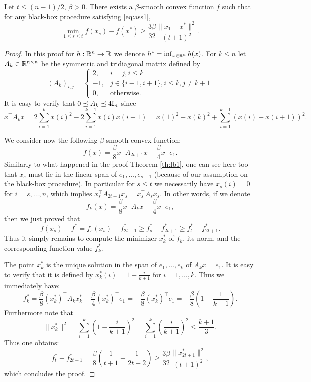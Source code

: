 \begin{theorem} \label{th:lb2}
Let $t \leq (n-1)/2$, $\beta >0$. There exists a $\beta$-smooth convex function $f$ such that for any black-box procedure satisfying \eqref{eq:ass1},
$$\min_{1 \leq s \leq t} f(x_s) - f(x^*) \geq  \frac{3 \beta}{32} \frac{\|x_1 - x^*\|^2}{(t+1)^2} .$$
\end{theorem}

\begin{proof} In this proof for $h: \mathbb{R}^n \rightarrow \mathbb{R}$ we denote $h^* = \inf_{x \in \mathbb{R}^n} h(x)$.
For $k \leq n$ let $A_k \in \mathbb{R}^{n \times n}$ be the symmetric and tridiagonal matrix defined by
$$(A_k)_{i,j}  = \left\{\begin{array}{ll} 
2, & i = j, i \leq k \\
-1, & j \in \{i-1, i+1\}, i \leq k, j \neq k+1\\
0, & \text{otherwise}.
\end{array}\right.$$
It is easy to verify that $0 \preceq A_k \preceq 4 \mathrm{I}_n$ since
$$x^{\top} A_k x = 2 \sum_{i=1}^k x(i)^2 - 2 \sum_{i=1}^{k-1} x(i) x(i+1) = x(1)^2 + x(k)^2 + \sum_{i=1}^{k-1} (x(i) - x(i+1))^2 .$$

We consider now the following $\beta$-smooth convex function:
$$f(x) = \frac{\beta}{8} x^{\top} A_{2 t + 1} x - \frac{\beta}{4} x^{\top} e_1 .$$
Similarly to what happened in the proof Theorem \ref{th:lb1}, one can see here too that $x_s$ must lie in the linear span of $e_1, \hdots, e_{s-1}$ (because of our assumption on the black-box procedure). In particular for $s \leq t$ we necessarily have $x_s(i) = 0$ for $i=s, \hdots, n$, which implies $x_s^{\top} A_{2 t+1} x_s = x_s^{\top} A_{s} x_s$. In other words, if we denote
$$f_k(x) = \frac{\beta}{8} x^{\top} A_{k} x - \frac{\beta}{4} x^{\top} e_1 ,$$
then we just proved that
$$f(x_s) - f^* = f_s(x_s) - f_{2t+1}^* \geq f_{s}^* - f_{2 t + 1}^* \geq f_{t}^* - f_{2 t + 1}^* .$$
Thus it simply remains to compute the minimizer $x^*_k$ of $f_k$, its norm, and the corresponding function value $f_k^*$.

The point $x^*_k$ is the unique solution in the span of $e_1, \hdots, e_k$ of $A_k x = e_1$. It is easy to verify that it is defined by $x^*_k(i) = 1 - \frac{i}{k+1}$ for $i=1, \hdots, k$. Thus we immediately have:
$$f^*_k = \frac{\beta}{8} (x^*_k)^{\top} A_{k} x^*_k - \frac{\beta}{4} (x^*_k)^{\top} e_1 = - \frac{\beta}{8} (x^*_k)^{\top} e_1 = - \frac{\beta}{8} \left(1 - \frac{1}{k+1}\right) .$$
Furthermore note that
$$\|x^*_k\|^2 = \sum_{i=1}^k \left(1 - \frac{i}{k+1}\right)^2 = \sum_{i=1}^k \left( \frac{i}{k+1}\right)^2 \leq \frac{k+1}{3} .$$
Thus one obtains:
$$f_{t}^* - f_{2 t+1}^* = \frac{\beta}{8} \left(\frac{1}{t+1} - \frac{1}{2 t + 2} \right) \geq \frac{3 \beta}{32} \frac{\|x^*_{2 t + 1}\|^2}{(t+1)^2},$$
which concludes the proof.
\end{proof}

